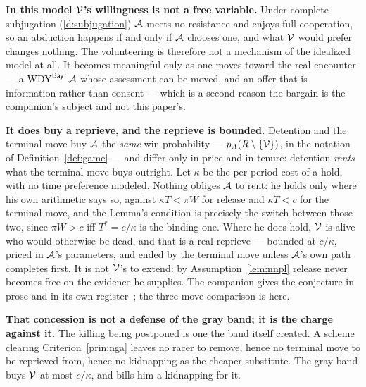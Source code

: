 \begin{remark}
\textbf{In this model $\mathcal{V}$'s willingness is not a free variable.} Under
complete subjugation (\ref{d:subjugation}) $\mathcal{A}$ meets no resistance and
enjoys full cooperation, so an abduction happens if and only if $\mathcal{A}$
chooses one, and what $\mathcal{V}$ would prefer changes nothing. The volunteering
is therefore not a mechanism of the idealized model at all. It becomes
meaningful only as one moves toward the real encounter --- a $\mathrm{WDY}^{\mathsf{Bay}}$
$\mathcal{A}$ whose assessment can be moved, and an offer that is information
rather than consent --- which is a second reason the bargain is the companion's
subject and not this paper's.

\textbf{It does buy a reprieve, and the reprieve is bounded.} Detention and the
terminal move buy $\mathcal{A}$ the \emph{same} win probability ---
$p_A(R\setminus\{\mathcal{V}\})$, in the notation of Definition~\ref{def:game} ---
and differ only in price and in tenure: detention \emph{rents} what the terminal
move buys outright. Let $\kappa$ be the per-period cost of a hold, with no time
preference modeled. Nothing obliges $\mathcal{A}$ to rent: he holds only where his
own arithmetic says so, against $\kappa T < \pi W$ for release and
$\kappa T < c$ for the terminal move, and the Lemma's condition is precisely the
switch between those two, since $\pi W > c$ iff $T^{*} = c/\kappa$ is the
binding one. Where he does hold, $\mathcal{V}$ is alive who would otherwise be dead,
and that is a real reprieve --- bounded at $c/\kappa$, priced in $\mathcal{A}$'s
parameters, and ended by the terminal move unless $\mathcal{A}$'s own path
completes first. It is not $\mathcal{V}$'s to extend: by Assumption~\ref{lem:nnpl}
release never becomes free on the evidence he supplies. The companion gives the
conjecture in prose and in its own register~\cite[\S4]{denial-spiral}; the
three-move comparison is here.

\textbf{That concession is not a defense of the gray band; it is the charge
against it.} The killing being postponed is one the band itself created. A
scheme clearing Criterion~\ref{prin:nga} leaves no racer to remove, hence no
terminal move to be reprieved from, hence no kidnapping as the cheaper
substitute. The gray band buys $\mathcal{V}$ at most $c/\kappa$, and bills him a
kidnapping for it.


\end{remark}
